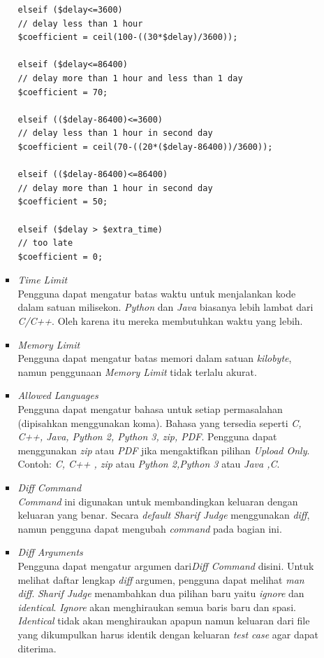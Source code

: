 \documentclass[a4paper,twoside]{article}
\begin{document}
\begin{enumerate}
\begin{enumerate}
\begin{itemize}
\begin{lstlisting}[backgroundcolor = \color{lightgray}]
elseif ($delay<=3600)
// delay less than 1 hour
$coefficient = ceil(100-((30*$delay)/3600));

elseif ($delay<=86400)
// delay more than 1 hour and less than 1 day
$coefficient = 70;

elseif (($delay-86400)<=3600)
// delay less than 1 hour in second day
$coefficient = ceil(70-((20*($delay-86400))/3600));

elseif (($delay-86400)<=86400)
// delay more than 1 hour in second day
$coefficient = 50;

elseif ($delay > $extra_time)
// too late
$coefficient = 0;				
				\end{lstlisting}
				
				\item \textit{Time Limit} \\
				Pengguna dapat mengatur batas waktu untuk menjalankan kode dalam satuan milisekon. \textit{Python} dan \textit{Java} biasanya lebih lambat dari \textit{C/C++}.	Oleh karena itu mereka membutuhkan waktu yang lebih.
				
				\item \textit{Memory Limit} \\
				Pengguna dapat mengatur batas memori dalam satuan \textit{kilobyte}, namun penggunaan \textit{Memory Limit} tidak terlalu akurat.
				
				\item \textit{Allowed Languages} \\
				Pengguna dapat mengatur bahasa untuk setiap permasalahan (dipisahkan menggunakan koma). Bahasa yang tersedia seperti \textit{C, C++, Java, Python 2, Python 3, zip, PDF}. Pengguna dapat menggunakan \textit{zip} atau \textit{PDF} jika mengaktifkan pilihan \textit{Upload Only}. Contoh: \textit{C, C++ , zip} atau \textit{Python 2,Python 3} atau \textit{Java ,C}.
				
				\item \textit{Diff Command} \\
				\textit{Command} ini digunakan untuk membandingkan keluaran dengan keluaran yang benar. Secara \textit{default Sharif Judge} menggunakan \textit{diff}, namun pengguna dapat mengubah \textit{command} pada bagian ini.
				
				\item \textit{Diff Arguments} \\
				Pengguna dapat mengatur argumen dari\textit{Diff Command} disini. Untuk melihat daftar lengkap \textit{diff} argumen, pengguna dapat melihat \textit{man diff}. \textit{Sharif Judge} menambahkan dua pilihan baru yaitu \textit{ignore} dan \textit{identical}. \textit{Ignore} akan menghiraukan semua baris baru dan spasi. \textit{Identical} tidak akan menghiraukan apapun namun keluaran dari file yang dikumpulkan harus identik dengan keluaran \textit{test case} agar dapat diterima.
				

\end{itemize}
\end{enumerate}
\end{enumerate}
\end{document}
